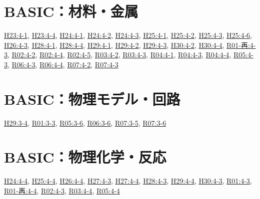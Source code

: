 \section{BASIC：材料・金属}
\hyperref[q:h23-reg-basic-4-1]{H23:4-1}, \hyperref[q:h23-reg-basic-4-4]{H23:4-4}, \hyperref[q:h24-reg-basic-4-1]{H24:4-1}, \hyperref[q:h24-reg-basic-4-2]{H24:4-2}, \hyperref[q:h24-reg-basic-4-3]{H24:4-3}, \hyperref[q:h25-reg-basic-4-1]{H25:4-1}, \hyperref[q:h25-reg-basic-4-2]{H25:4-2}, \hyperref[q:h25-reg-basic-4-3]{H25:4-3}, \hyperref[q:h25-reg-basic-4-6]{H25:4-6}, \hyperref[q:h26-reg-basic-4-3]{H26:4-3}, \hyperref[q:h28-reg-basic-4-1]{H28:4-1}, \hyperref[q:h28-reg-basic-4-4]{H28:4-4}, \hyperref[q:h29-reg-basic-4-1]{H29:4-1}, \hyperref[q:h29-reg-basic-4-2]{H29:4-2}, \hyperref[q:h29-reg-basic-4-3]{H29:4-3}, \hyperref[q:h30-reg-basic-4-2]{H30:4-2}, \hyperref[q:h30-reg-basic-4-4]{H30:4-4}, \hyperref[q:r01-ret-basic-4-3]{R01-再:4-3}, \hyperref[q:r02-reg-basic-4-2]{R02:4-2}, \hyperref[q:r02-reg-basic-4-4]{R02:4-4}, \hyperref[q:r02-reg-basic-4-5]{R02:4-5}, \hyperref[q:r03-reg-basic-4-2]{R03:4-2}, \hyperref[q:r03-reg-basic-4-3]{R03:4-3}, \hyperref[q:r04-reg-basic-4-1]{R04:4-1}, \hyperref[q:r04-reg-basic-4-3]{R04:4-3}, \hyperref[q:r04-reg-basic-4-4]{R04:4-4}, \hyperref[q:r05-reg-basic-4-3]{R05:4-3}, \hyperref[q:r06-reg-basic-4-3]{R06:4-3}, \hyperref[q:r06-reg-basic-4-4]{R06:4-4}, \hyperref[q:r07-reg-basic-4-2]{R07:4-2}, \hyperref[q:r07-reg-basic-4-3]{R07:4-3}
\section{BASIC：物理モデル・回路}
\hyperref[q:h29-reg-basic-3-4]{H29:3-4}, \hyperref[q:r01-reg-basic-3-3]{R01:3-3}, \hyperref[q:r05-reg-basic-3-6]{R05:3-6}, \hyperref[q:r06-reg-basic-3-6]{R06:3-6}, \hyperref[q:r07-reg-basic-3-5]{R07:3-5}, \hyperref[q:r07-reg-basic-3-6]{R07:3-6}
\section{BASIC：物理化学・反応}
\hyperref[q:h24-reg-basic-4-4]{H24:4-4}, \hyperref[q:h25-reg-basic-4-4]{H25:4-4}, \hyperref[q:h26-reg-basic-4-4]{H26:4-4}, \hyperref[q:h27-reg-basic-4-3]{H27:4-3}, \hyperref[q:h27-reg-basic-4-4]{H27:4-4}, \hyperref[q:h28-reg-basic-4-3]{H28:4-3}, \hyperref[q:h29-reg-basic-4-4]{H29:4-4}, \hyperref[q:h30-reg-basic-4-3]{H30:4-3}, \hyperref[q:r01-reg-basic-4-3]{R01:4-3}, \hyperref[q:r01-ret-basic-4-4]{R01-再:4-4}, \hyperref[q:r02-reg-basic-4-3]{R02:4-3}, \hyperref[q:r03-reg-basic-4-4]{R03:4-4}, \hyperref[q:r05-reg-basic-4-4]{R05:4-4}
